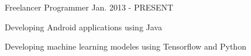 

\begin{cventries}

  \cventry
      {Freelancer} %
    { Programmer} %
    {} %
    {Jan. 2013 - PRESENT} %
    {
      \begin{cvitems} %
        \item {Developing Android  applications using Java}
        \item {Developing machine learning modeles using Tensorflow and Python}
        \end{cvitems}
    }

 

 

 
 

\end{cventries}
